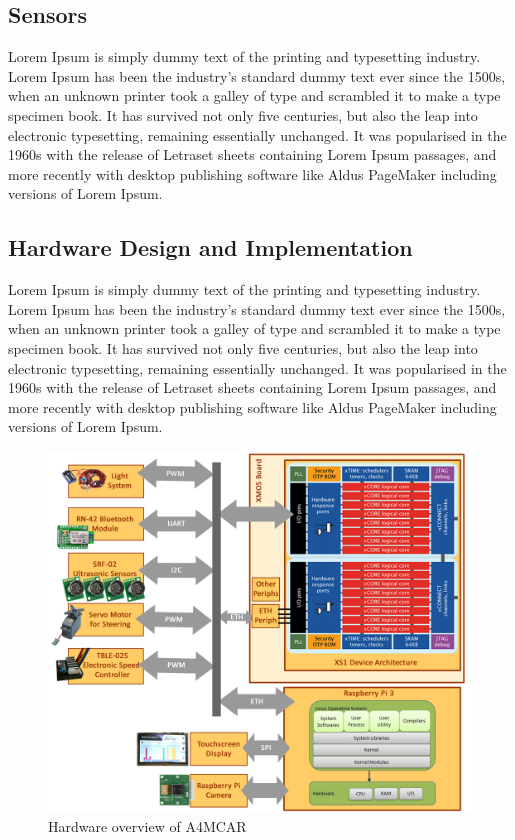 \subsection{Sensors}
Lorem Ipsum is simply dummy text of the printing and typesetting industry. Lorem Ipsum has been the industry's standard dummy text ever since the 1500s, when an unknown printer took a galley of type and scrambled it to make a type specimen book. It has survived not only five centuries, but also the leap into electronic typesetting, remaining essentially unchanged. It was popularised in the 1960s with the release of Letraset sheets containing Lorem Ipsum passages, and more recently with desktop publishing software like Aldus PageMaker including versions of Lorem Ipsum.

\subsection{Hardware Design and Implementation}
Lorem Ipsum is simply dummy text of the printing and typesetting industry. Lorem Ipsum has been the industry's standard dummy text ever since the 1500s, when an unknown printer took a galley of type and scrambled it to make a type specimen book. It has survived not only five centuries, but also the leap into electronic typesetting, remaining essentially unchanged. It was popularised in the 1960s with the release of Letraset sheets containing Lorem Ipsum passages, and more recently with desktop publishing software like Aldus PageMaker including versions of Lorem Ipsum.
\begin{figure}[htb]
	\includegraphics[scale=0.35]{content/images/hwoverview.png}
	\caption{Hardware overview of A4MCAR}
	\label{fig:hwoverview}
\end{figure}
